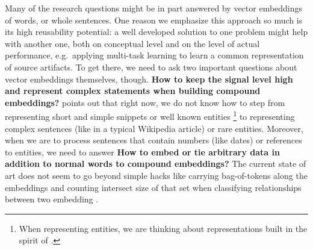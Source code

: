 Many of the research questions might be in part answered by
vector embeddings of words, or whole sentences.
One reason we emphasize this approach so much is its high reusability potential:
a well developed solution to one problem might help with another one, both
on conceptual level and on the level of actual performance, e.g.\ applying
multi-task learning to learn a common representation of source artifacts.
To get there, we need to ask two important questions about vector embeddings
themselves, though.
\textbf{How to keep the signal level high and represent
complex statements when building compound embeddings?} points out that right
now, we do not know how to step from representing short and simple snippets or well known entities%
\footnote{When representing entities, we are thinking about representations
built in the spirit of \cite{QANTA}.}
to representing complex sentences (like in a typical Wikipedia article) or
rare entities.
Moreover, when we are to process sentences that contain numbers (like dates)
or references to entities, we need to answer
\textbf{How to embed or tie arbitrary data in addition to normal words
to compound embeddings?}
The current state of art does not seem to go beyond simple hacks like
carrying bag-of-tokens along the embeddings and counting intersect size
of that set when classifying relationships between two embedding \cite{Yu2014Deep}.
